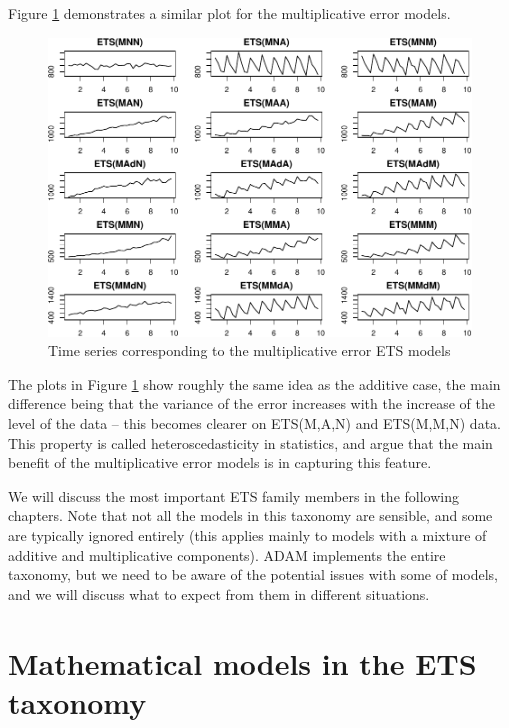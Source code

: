 \documentclass[
]{book}
\theoremstyle{definition}
\theoremstyle{definition}
\theoremstyle{definition}
\theoremstyle{definition}
\theoremstyle{remark}
\begin{document}
Figure \ref{fig:ETSTaxonomyMultiplicative} demonstrates a similar plot for the multiplicative error models.

\begin{figure}
\centering
\includegraphics{Svetunkov--2022----ADAM_files/figure-latex/ETSTaxonomyMultiplicative-1.pdf}
\caption{\label{fig:ETSTaxonomyMultiplicative}Time series corresponding to the multiplicative error ETS models}
\end{figure}

The plots in Figure \ref{fig:ETSTaxonomyMultiplicative} show roughly the same idea as the additive case, the main difference being that the variance of the error increases with the increase of the level of the data -- this becomes clearer on ETS(M,A,N) and ETS(M,M,N) data. This property is called heteroscedasticity in statistics, and \citet{Hyndman2008b} argue that the main benefit of the multiplicative error models is in capturing this feature.

We will discuss the most important ETS family members in the following chapters. Note that not all the models in this taxonomy are sensible, and some are typically ignored entirely (this applies mainly to models with a mixture of additive and multiplicative components). ADAM implements the entire taxonomy, but we need to be aware of the potential issues with some of models, and we will discuss what to expect from them in different situations.

\hypertarget{ETSTaxonomyMaths}{%
\section{Mathematical models in the ETS taxonomy}\label{ETSTaxonomyMaths}}
\end{document}
